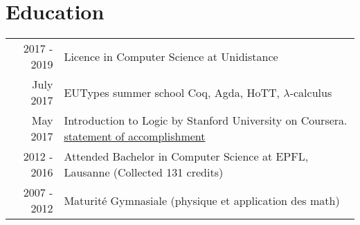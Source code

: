 \documentclass[a4paper,10pt]{article} %
\begin{document}
\section{Education}
\renewcommand{\arraystretch}{1.3}
\begin{tabular}{rp{10.3cm}}	
2017 - 2019 & Licence in Computer Science at Unidistance  \\ 

July 2017 & EUTypes summer school \footnotesize{Coq, Agda, HoTT, $\lambda$-calculus} \\
May 2017 & Introduction to Logic by Stanford University on Coursera. \footnotesize{\href{https://www.coursera.org/account/accomplishments/certificate/RPGEPLA94HFF}{statement of accomplishment}}\\
2012 - 2016 & Attended Bachelor in Computer Science at EPFL, Lausanne (\footnotesize{Collected 131 credits})\\


2007 - 2012 & Maturité Gymnasiale \footnotesize{(physique et application des math)}\\
\end{tabular}

\end{document}
